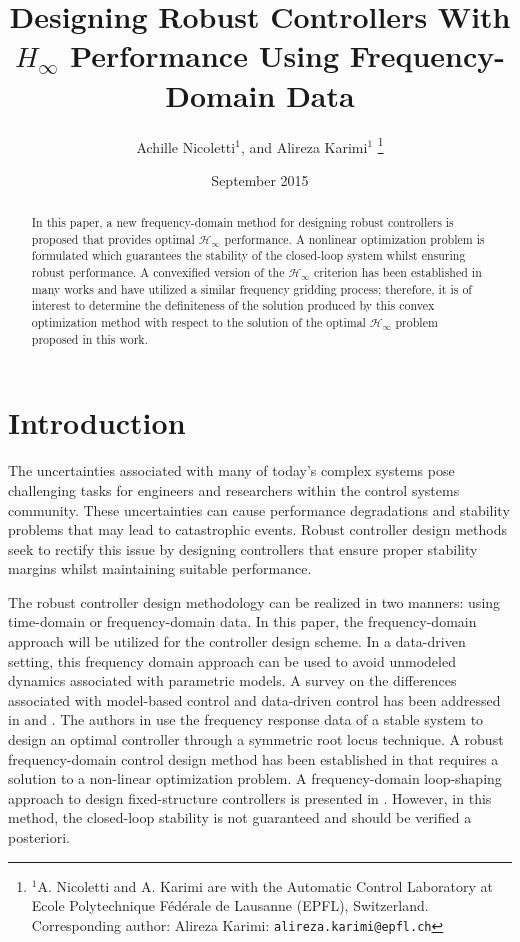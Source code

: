 \documentclass[letterpaper, 10 pt, conference]{ieeeconf}  %
\title{Designing Robust Controllers With $H_{\infty}$ Performance Using Frequency-Domain Data}
\author{Achille Nicoletti$^{1}$, and Alireza Karimi$^{1}$
\thanks{$^{1}$A. Nicoletti and A. Karimi are with the Automatic Control Laboratory at Ecole Polytechnique F\'ed\'erale de Lausanne (EPFL), Switzerland.
       Corresponding author: Alireza Karimi: {\tt\small alireza.karimi@epfl.ch}}
\date{September 2015}
}
\begin{document}
\maketitle
\thispagestyle{empty}
\pagestyle{empty}


\begin{abstract}
In this paper, a new frequency-domain method for designing robust controllers is proposed that provides optimal $\mathcal{H}_{\infty}$ performance. A nonlinear optimization problem is formulated which guarantees the stability of the closed-loop system whilst ensuring robust performance. A convexified version of the $\mathcal{H}_{\infty}$ criterion has been established in many works and have utilized a similar frequency gridding process; therefore, it is of interest to determine the definiteness of the solution produced by this convex optimization method with respect to the solution of the optimal $\mathcal{H}_{\infty}$ problem proposed in this work. 
\end{abstract}


\section{Introduction}
The uncertainties associated with many of today's complex systems pose challenging tasks for engineers and researchers within the control systems community. These uncertainties can cause performance degradations and stability problems that may lead to catastrophic events. Robust controller design methods seek to rectify this issue by designing controllers that ensure proper stability margins whilst maintaining suitable performance. 

The robust controller design methodology can be realized in two manners: using time-domain or frequency-domain data. In this paper, the frequency-domain approach will be utilized for the controller design scheme. In a data-driven setting, this frequency domain approach can be used to avoid unmodeled dynamics associated with parametric models. A survey on the differences associated with model-based control and data-driven control has been addressed in \cite{HW13} and \cite{BCE12}. The authors in \cite{HDAV10} use the frequency response data of a stable system to design an optimal controller through a symmetric root locus technique. A robust frequency-domain control design method has been established in \cite{KNND13b} that requires a solution to a non-linear optimization problem. A frequency-domain loop-shaping approach to design fixed-structure controllers is presented in \cite{KNND13c}. However, in this method, the closed-loop stability is not guaranteed and should be verified a posteriori.
\end{document}
